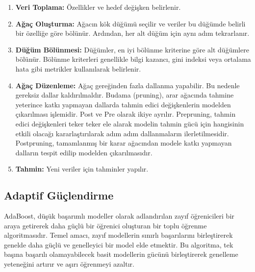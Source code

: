 \begin{enumerate}
\item \textbf{Veri Toplama:} Özellikler ve hedef değişken belirlenir.
\item \textbf{Ağaç Oluşturma:} Ağacın kök düğümü seçilir ve veriler bu düğümde belirli bir özelliğe göre bölünür. Ardından, her alt düğüm için aynı adım tekrarlanır.
\item \textbf{Düğüm Bölünmesi:} Düğümler, en iyi bölünme kriterine göre alt düğümlere bölünür. Bölünme kriterleri genellikle bilgi kazancı, gini indeksi veya ortalama hata gibi metrikler kullanılarak belirlenir.
\item \textbf{Ağaç Düzenleme:} Ağaç gereğinden fazla dallanma yapabilir. Bu nedenle gereksiz dallar kaldırılmaldır. Budama (pruning), arar ağacında tahmine yeterince katkı yapmayan dallarda tahmin edici değişkenlerin modelden çıkarılması işlemidir. Post ve Pre olarak ikiye ayrılır. Prepruning, tahmin edici değişkenleri teker teker ele alarak modelin tahmin gücü için hangisinin etkili olacağı kararlaştırılarak adım adım dallanmaların ilerletilmesidir. Postpruning, tamamlanmış bir karar ağacından modele katkı yapmayan dalların tespit edilip modelden çıkarılmasıdır.
\item \textbf{Tahmin:} Yeni veriler için tahminler yapılır.
\end{enumerate}

\subsection{Adaptif Güçlendirme}
AdaBoost, düşük başarımlı modeller olarak adlandırılan zayıf öğrenicileri bir araya getirerek daha güçlü bir öğrenici oluşturan bir toplu öğrenme algoritmasıdır. Temel amacı, zayıf modellerin sınırlı başarılarını birleştirerek genelde daha güçlü ve genelleyici bir model elde etmektir. Bu algoritma, tek başına başarılı olamayabilecek basit modellerin gücünü birleştirerek genelleme yeteneğini artırır ve aşırı öğrenmeyi azaltır.

